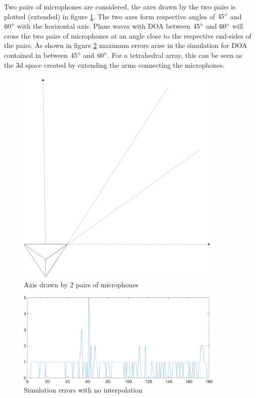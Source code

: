 Two pairs of microphones are considered, the axes drawn by the two pairs is plotted (extended) in figure \ref{fig:locerrortetra}. The two axes form respective angles of $45\degree$ and $60\degree$ with the horizontal axis. Plane waves with DOA between $45\degree$ and $60\degree$ will cross the two pairs of microphones at an angle close to the respective end-sides of the pairs. As shown in figure \ref{fig:errorsimulation1} maximum errors arise in the simulation for DOA contained in between $45\degree$ and $60\degree$. For a tetrahedral array, this can be seen as the 3d space created by extending the arms connecting the microphones. 

\begin{figure}[H]
    \centering
    \includegraphics[width=0.9\textwidth]{Figures/locerrors.png}
    \caption{Axis drawn by 2 pairs of microphones}
    \label{fig:locerrortetra}
\end{figure}

\begin{figure}[H]
    \centering
    \includegraphics[width=0.9\textwidth]{Figures/errorphinointerpolationandrounding.png}
    \caption{Simulation errors with no interpolation}
    \label{fig:errorsimulation1}
\end{figure}

